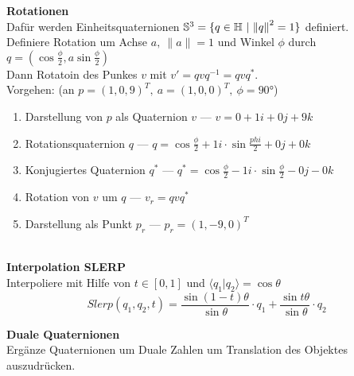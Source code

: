 \textbf{Rotationen}\\
Dafür werden Einheitsquaternionen \(\mathbb{S}^3 = \{q \in \quaternionen\ \lvert\ {\|{q}\|}^2 = 1\}\) definiert.\\
Definiere Rotation um Achse \(a,\ \|a\| = 1\) und Winkel \(\phi\) durch \(q = (\cos \frac{\phi}{2}, a \sin \frac{\phi}{2})\)\\
Dann Rotatoin des Punkes \(v\) mit \(v' = qvq^{-1} = qvq^*\).\\
Vorgehen: (an \(p = (1, 0, 9)^T,\ a = (1, 0, 0)^T,\ \phi = 90°\))
\begin{enumerate}
\item Darstellung von \(p\) als Quaternion \(v\) --- \(v = 0 + 1i + 0j + 9k\)
\item Rotationsquaternion \(q\) --- \( q = \cos \frac{\phi}{2} + 1i \cdot \sin \frac{phi}{2} + 0j + 0k\)
\item Konjugiertes Quaternion \(q^*\) --- \(q^* = \cos \frac{\phi}{2} - 1i \cdot \sin \frac{\phi}{2} - 0j -0k\)
\item Rotation von \(v\) um \(q\) --- \(v_r = qvq^*\)
\item Darstellung als Punkt \(p_r\) --- \(p_r = (1, -9, 0)^T\)
\end{enumerate}\\

\textbf{Interpolation SLERP}\\
Interpoliere mit Hilfe von \(t \in [0, 1]\) und \(\langle q_1 \lvert q_2 \rangle = \cos \theta\)
\[ \mathit{Slerp}(q_1, q_2, t) = \frac{\sin(1-t)\theta}{\sin \theta} \cdot q_1 + \frac{\sin t\theta}{\sin \theta} \cdot q_2 \]

\textbf{Duale Quaternionen}\\
Ergänze Quaternionen um Duale Zahlen um Translation des Objektes auszudrücken.